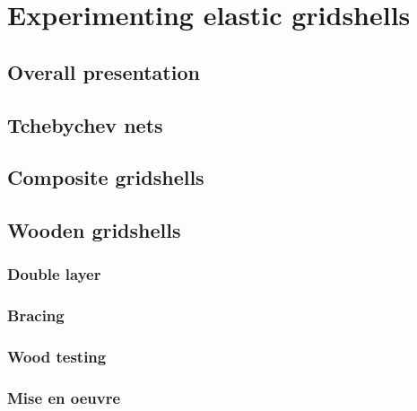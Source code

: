 \chapter{Experimenting elastic gridshells}

\section{Overall presentation}

\section{Tchebychev nets}

\section{Composite gridshells}

\section{Wooden gridshells}
	\subsection{Double layer}
	\subsection{Bracing}
	\subsection{Wood testing}
	\subsection{Mise en oeuvre}



